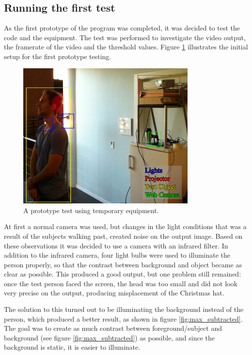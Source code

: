 \subsection{Running the first test}
As the first prototype of the program was completed, it was decided to test the code and the  equipment. The test was performed to investigate the video output, the framerate of the video and the threshold values. Figure \ref{fig:ir_cam_test} illustrates the initial setup for the first prototype testing.

\begin{figure}[htbp]
\centering
\includegraphics[width=0.80\textwidth]{Pictures/Test/TestSetup.jpg}
\caption{A prototype test using temporary equipment.}
\label{fig:ir_cam_test}
\end{figure} 

At first a normal camera was used, but changes in the light conditions that was a result of the subjects walking past, created noise on the output image. Based on these observations it was decided to use a camera with an infrared filter. In addition to the infrared camera, four light bulbs were used to illuminate the person properly, so that the contrast between background and object became as clear as possible. This produced a good output, but one problem still remained: once the test person faced the screen, the head was too small and did not look very precise on the output, producing misplacement of the Christmas hat.

The solution to this turned out to be illuminating the background instead of the person, which produced a better result, as shown in figure \ref{fig:max_subtracted}. The goal was to create as much contrast between foreground/subject and background (see figure \ref{fig:max_subtracted}) as possible, and since the background is static, it is easier to illuminate.

